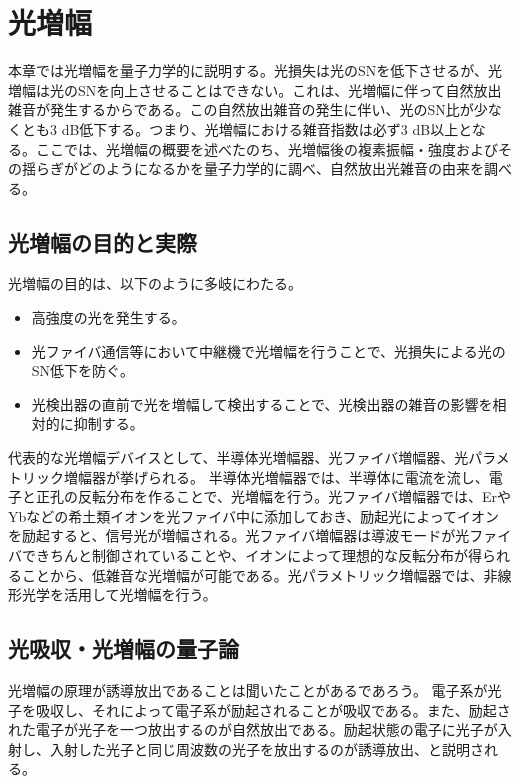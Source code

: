 \chapter{光増幅}

本章では光増幅を量子力学的に説明する。光損失は光のSNを低下させるが、光増幅は光のSNを向上させることはできない。これは、光増幅に伴って自然放出雑音が発生するからである。この自然放出雑音の発生に伴い、光のSN比が少なくとも3 dB低下する。つまり、光増幅における雑音指数は必ず3 dB以上となる。ここでは、光増幅の概要を述べたのち、光増幅後の複素振幅・強度およびその揺らぎがどのようになるかを量子力学的に調べ、自然放出光雑音の由来を調べる。

\section{光増幅の目的と実際}

光増幅の目的は、以下のように多岐にわたる。
\begin{itemize}
\item 高強度の光を発生する。
\item 光ファイバ通信等において中継機で光増幅を行うことで、光損失による光のSN低下を防ぐ。
\item 光検出器の直前で光を増幅して検出することで、光検出器の雑音の影響を相対的に抑制する。
\end{itemize}

代表的な光増幅デバイスとして、半導体光増幅器、光ファイバ増幅器、光パラメトリック増幅器が挙げられる。
半導体光増幅器では、半導体に電流を流し、電子と正孔の反転分布を作ることで、光増幅を行う。光ファイバ増幅器では、ErやYbなどの希土類イオンを光ファイバ中に添加しておき、励起光によってイオンを励起すると、信号光が増幅される。光ファイバ増幅器は導波モードが光ファイバできちんと制御されていることや、イオンによって理想的な反転分布が得られることから、低雑音な光増幅が可能である。光パラメトリック増幅器では、非線形光学を活用して光増幅を行う。


\section{光吸収・光増幅の量子論}
光増幅の原理が誘導放出であることは聞いたことがあるであろう。
電子系が光子を吸収し、それによって電子系が励起されることが吸収である。また、励起された電子が光子を一つ放出するのが自然放出である。励起状態の電子に光子が入射し、入射した光子と同じ周波数の光子を放出するのが誘導放出、と説明される。

